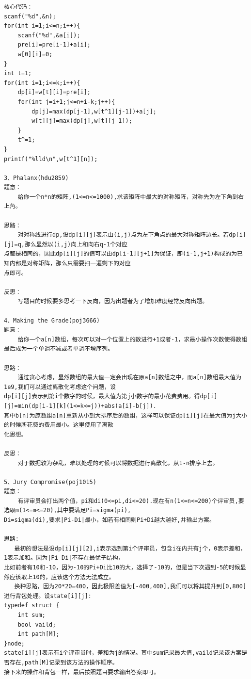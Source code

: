 \documentclass[twoside]{article}
\begin{document}
\begin{lstlisting}
核心代码：
scanf("%d",&n);
for(int i=1;i<=n;i++){
    scanf("%d",&a[i]);
    pre[i]=pre[i-1]+a[i];
    w[0][i]=0;
}
int t=1;
for(int i=1;i<=k;i++){
    dp[i]=w[t][i]=pre[i];
    for(int j=i+1;j<=n+i-k;j++){
        dp[j]=max(dp[j-1],w[t^1][j-1])+a[j];
        w[t][j]=max(dp[j],w[t][j-1]);
    }
    t^=1;
}
printf("%lld\n",w[t^1][n]);

3、Phalanx(hdu2859)
题意：
    给你一个n*n的矩阵,(1<=n<=1000),求该矩阵中最大的对称矩阵，对称先为左下角到右上角。

思路：
    对对称线进行dp,设dp[i][j]表示由(i,j)点为左下角点的最大对称矩阵边长。若dp[i][j]=q,那么显然以(i,j)向上和向右q-1个对应
点都是相同的，因此dp[i][j]的值可以由dp[i-1][j+1]为保证，即(i-1,j+1)构成的为已知内部是对称矩阵，那么只需要扫一遍剩下的对应
点即可。

反思：
    写题目的时候要多思考一下反向，因为出题者为了增加难度经常反向出题。
    
4、Making the Grade(poj3666)
题意：
    给你一个a[n]数组，每次可以对一个位置上的数进行+1或者-1，求最小操作次数使得数组最后成为一个单调不减或者单调不增序列。

思路：
    通过贪心考虑，显然数组的最大值一定会出现在原a[n]数组之中，而a[n]数组最大值为1e9,我们可以通过离散化考虑这个问题，设
dp[i][j]表示到第i个数字的时候，最大值为第j小数字的最小花费费用。得dp[i][j]=min(dp[i-1][k](1<=k<=j))+abs(a[i]-b[j]).
其中b[n]为原数组a[n]重新从小到大排序后的数组，这样可以保证dp[i][j]在最大值为j大小的时候所花费的费用最小。这里使用了离散
化思想。

反思：
    对于数据较为杂乱，难以处理的时候可以将数据进行离散化，从1-n排序上去。
    
5、Jury Compromise(poj1015)
题意：
    有评审员会打出两个值，pi和di(0<=pi,di<=20).现在有n(1<=n<=200)个评审员,要选取m(1<=m<=20),其中要满足Pi=sigma(pi),
Di=sigma(di),要求|Pi-Di|最小，如若有相同则Pi+Di越大越好,并输出方案。

思路:
   最初的想法是设dp[i][j][2],i表示选到第i个评审员，包含i在内共有j个，0表示差和，1表示加和。因为|Pi-Di|不存在最优子结构，
比如前者有10和-10，因为-10的Pi+Di比10的大，选择了-10的，但是当下次遇到-5的时候显然应该取上10的，应该这个方法无法成立。
   换种思路，因为20*20=400，因此极限差值为[-400,400],我们可以将其提升到[0,800]进行背包处理。设state[i][j]:
typedef struct {
    int sum;
    bool vaild;
    int path[M];
}node;
state[i][j]表示有i个评审员时，差和为j的情况。其中sum记录最大值,vaild记录该方案是否存在,path[M]记录到该方法的操作顺序。
接下来的操作和背包一样，最后按照题目要求输出答案即可。


\end{lstlisting}
\end{document}
